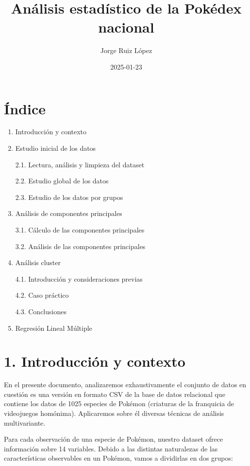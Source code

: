 \documentclass[
  12pt,
]{extreport}
\title{Análisis estadístico de la Pokédex nacional}
\author{Jorge Ruiz López}
\date{2025-01-23}
\begin{document}
\maketitle


\maketitle

\chapter{Índice}\label{uxedndice}

\begin{enumerate}
\def\labelenumi{\arabic{enumi}.}
\item
  Introducción y contexto
\item
  Estudio inicial de los datos

  2.1. Lectura, análisis y limpieza del dataset

  2.2. Estudio global de los datos

  2.3. Estudio de los datos por grupos
\item
  Análisis de componentes principales

  3.1. Cálculo de las componentes principales

  3.2. Análisis de las componentes principales
\item
  Análisis cluster

  4.1. Introducción y consideraciones previas

  4.2. Caso práctico

  4.3. Conclusiones
\item
  Regresión Lineal Múltiple
\end{enumerate}

\chapter{1. Introducción y contexto}\label{introducciuxf3n-y-contexto}

En el presente documento, analizaremos exhaustivamente el conjunto de
datos en cuestión es una versión en formato CSV de la base de datos
relacional que contiene los datos de 1025 especies de Pokémon (criaturas
de la franquicia de videojuegos homónima). Aplicaremos sobre él diversas
técnicas de análisis multivariante.

Para cada observación de una especie de Pokémon, nuestro dataset ofrece
información sobre 14 variables. Debido a las distintas naturalezas de
las características observables en un Pokémon, vamos a dividirlas en dos
grupos:
\end{document}

